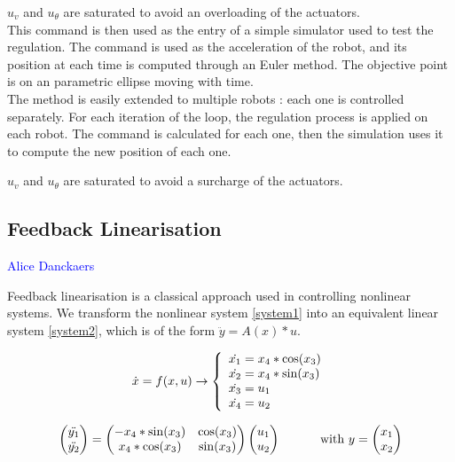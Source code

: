 $u_v$ and $u_{\theta}$ are saturated to avoid an overloading of the actuators.\\

This command is then used as the entry of a simple simulator used to test the regulation.
The command is used as the acceleration of the robot, and its position at each time is computed through an Euler method. The objective point is on an parametric ellipse moving with time.\\

The method is easily extended to multiple robots : each one is controlled separately. For each iteration of the loop, the regulation process is applied on each robot. The command is calculated for each one, then the simulation uses it to compute the new position of each one.

$u_v$ and $u_{\theta}$ are saturated to avoid a surcharge of the actuators. 

\subsection{Feedback Linearisation}
\vspace*{0.5 cm}
	\textcolor{blue} {Alice Danckaers}
\vspace*{0.5cm}

Feedback linearisation is a classical approach used in controlling nonlinear systems. We transform the nonlinear system \ref{system1} into an equivalent linear system \ref{system2}, which is of the form $\ddot{y}=A(x)*u$.

\begin{equation}
\dot{x} = f(x,u) \rightarrow \left\{ 
\begin{array}{l l}
  \dot{x_1} = x_4 * \cos(x_3)\\
  \dot{x_2} = x_4 * \sin(x_3)\\
  \dot{x_3} = u_1\\
  \dot{x_4} = u_2\\
\end{array} \right.
\label{system1}
\end{equation}

\begin{equation}
\begin{pmatrix}
	\ddot{y_1}\\
	\ddot{y_2} 
\end{pmatrix}
=
\begin{pmatrix}
	-x_4*\sin(x_3) & \cos(x_3)\\
	 x_4*\cos(x_3) & \sin(x_3)
\end{pmatrix}
\begin{pmatrix}
	u_1\\
	u_2
\end{pmatrix}   
\hspace*{1cm} \textnormal{ with } y = \begin{pmatrix}
	x_1\\
	x_2
\end{pmatrix}
\label{system2}
\end{equation}

